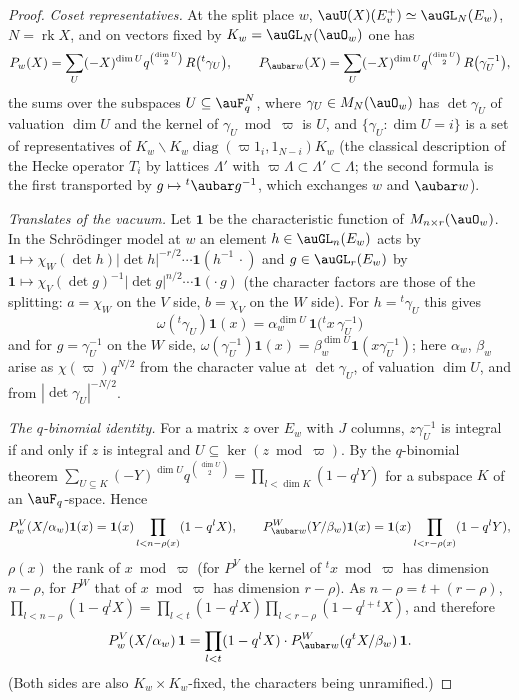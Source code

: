 \documentclass[10pt]{amsart}
\theoremstyle{definition}
\theoremstyle{remark}
\begin{document}
\begin{proof}
\emph{Coset representatives.} At the split place $w$, $\auU(X)(E^+_v)\simeq\auGL_N(E_w)$, $N=
\operatorname{rk}X$, and on vectors fixed by $K_w=\auGL_N(\auO_w)$ one has
\[
P_w(X)=\sum_{U}(-X)^{\dim U}q^{\binom{\dim U}2}\,R\bigl({}^t\gamma_U\bigr),\qquad
P_{\aubar w}(X)=\sum_U(-X)^{\dim U}q^{\binom{\dim U}2}\,R\bigl(\gamma_U^{-1}\bigr),
\]
the sums over the subspaces $U\subseteq\auF_q^N$, where $\gamma_U\in M_N(\auO_w)$ has
$\det\gamma_U$ of valuation $\dim U$ and the kernel of $\gamma_U\bmod\varpi$ is $U$, and
$\{\gamma_U:\dim U=i\}$ is a set of representatives of $K_w\backslash K_w
\operatorname{diag}(\varpi1_i,1_{N-i})K_w$ (the classical description of the Hecke operator
$T_i$ by lattices $\Lambda'$ with $\varpi\Lambda\subset\Lambda'\subset\Lambda$; the second formula is
the first transported by $g\mapsto{}^t\aubar g^{-1}$, which exchanges $w$ and $\aubar w$).

\emph{Translates of the vacuum.} Let $\mathbf 1$ be the characteristic function of
$M_{n\times r}(\auO_w)$. In the Schr\"odinger model at $w$ an element $h\in\auGL_n(E_w)$ acts by
$\mathbf 1\mapsto\chi_W(\det h)|\det h|^{-r/2}\cdots\mathbf 1(h^{-1}\,\cdot)$ and $g\in
\auGL_r(E_w)$ by $\mathbf 1\mapsto\chi_V(\det g)^{-1}|\det g|^{n/2}\cdots\mathbf 1(\cdot\,g)$ (the
character factors are those of the splitting: $a=\chi_W$ on the $V$ side, $b=\chi_V$ on the $W$
side). For $h={}^t\gamma_U$ this gives
\[
\omega({}^t\gamma_U)\mathbf 1(x)=\alpha_w^{\dim U}\,\mathbf 1\bigl({}^tx\,\gamma_U^{-1}\bigr)
\]
and for $g=\gamma_U^{-1}$ on the $W$ side, $\omega(\gamma_U^{-1})\mathbf 1(x)=\beta_w^{\dim U}
\mathbf 1(x\gamma_U^{-1})$; here $\alpha_w$, $\beta_w$ arise as $\chi(\varpi)q^{N/2}$ from the
character value at $\det\gamma_U$, of valuation $\dim U$, and from $|\det\gamma_U|^{-N/2}$.

\emph{The $q$-binomial identity.} For a matrix $z$ over $E_w$ with $J$ columns, $z\gamma_U^{-1}$ is
integral if and only if $z$ is integral and $U\subseteq\ker(z\bmod\varpi)$. By the $q$-binomial
theorem $\sum_{U\subseteq K}(-Y)^{\dim U}q^{\binom{\dim U}2}=\prod_{l<\dim K}(1-q^lY)$ for a
subspace $K$ of an $\auF_q$-space. Hence
\[
P^V_w(X/\alpha_w)\mathbf 1(x)=\mathbf 1(x)\prod_{l<n-\rho(x)}(1-q^lX),\qquad
P^W_{\aubar w}(Y/\beta_w)\mathbf 1(x)=\mathbf 1(x)\prod_{l<r-\rho(x)}(1-q^lY),
\]
$\rho(x)$ the rank of $x\bmod\varpi$ (for $P^V$ the kernel of ${}^tx\bmod\varpi$ has dimension
$n-\rho$, for $P^W$ that of $x\bmod\varpi$ has dimension $r-\rho$). As $n-\rho=t+(r-\rho)$,
$\prod_{l<n-\rho}(1-q^lX)=\prod_{l<t}(1-q^lX)\prod_{l<r-\rho}(1-q^{l+t}X)$, and therefore
\begin{equation}\label{pga:eq-vac}
P^V_w(X/\alpha_w)\,\mathbf 1=\prod_{l<t}(1-q^lX)\cdot P^W_{\aubar w}(q^tX/\beta_w)\,\mathbf 1 .
\end{equation}
(Both sides are also $K_w\times K_w$-fixed, the characters being unramified.)


\end{proof}
\end{document}
